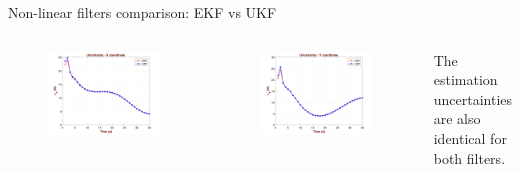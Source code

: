 \begin{frame}{Non-linear filters comparison: EKF vs UKF}
\begin{columns}
        \begin{figure}
            \centering
            \includegraphics[width=0.6\linewidth]{Figures//Part3/EKFvsUKF_Uncertainty_Xcoord.png}
        \end{figure}
        \vspace{-10pt}
        \begin{figure}
            \centering
            \includegraphics[width=0.6\linewidth]{Figures//Part3/EKFvsUKF_Uncertainty_Ycoord.png}
        \end{figure}
        The estimation uncertainties are also identical for both filters.
\end{columns}    
\end{frame}
